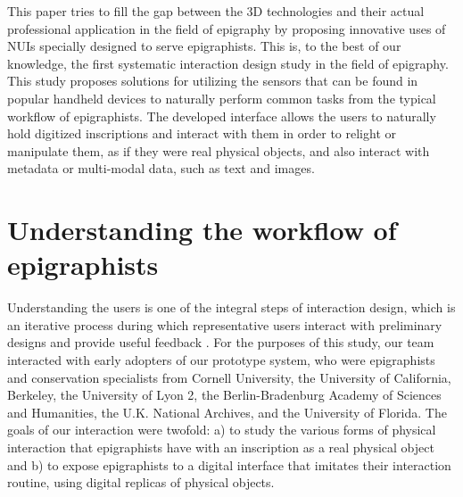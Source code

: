 \documentclass[amsthm,ebook]{saparticle}
\begin{document}
This paper tries to fill the gap between the 3D technologies and their actual professional application in the field of
epigraphy by proposing innovative uses of NUIs specially designed to serve epigraphists. This is, to the best of our
knowledge, the first systematic interaction design study in the field of epigraphy. This study proposes solutions for
utilizing the sensors that can be found in popular handheld devices to naturally perform common tasks from the typical
workflow of epigraphists. The developed interface allows the users to naturally hold digitized inscriptions and
interact with them in order to relight or manipulate them, as if they were real physical objects, and also interact
with metadata or multi-modal data, such as text and images. 

\section{Understanding the workflow of epigraphists}


\noindent Understanding the users is one of the integral steps of interaction design, which is an iterative process during which
representative users interact with preliminary designs and provide useful feedback \citep{preece_interaction_2015}. For the
purposes of this study, our team interacted with early adopters of our prototype system, who were epigraphists and
conservation specialists from Cornell University, the University of California, Berkeley, the University of Lyon 2, the
Berlin-Bradenburg Academy of Sciences and Humanities, the U.K. National Archives, and the University of Florida. The
goals of our interaction were twofold: a) to study the various forms of physical interaction that epigraphists have
with an inscription as a real physical object and b) to expose epigraphists to a digital interface that imitates
their interaction routine, using digital replicas of physical objects.
\end{document}
